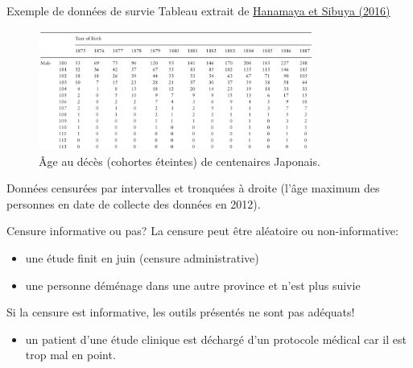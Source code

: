 \documentclass[
  ignorenonframetext,
]{beamer}
\providecommand{\tightlist}{%
  \setlength{\itemsep}{0pt}\setlength{\parskip}{0pt}}\usepackage{longtable,booktabs,array}
\begin{document}
\begin{frame}{Exemple de données de survie}
\protect\hypertarget{exemple-de-donnuxe9es-de-survie}{}
Tableau extrait de \href{https://doi.org/10.1093/gerona/glv113}{Hanamaya
et Sibuya (2016)}

\begin{figure}

{\centering \includegraphics[width=0.8\textwidth,height=\textheight]{figures/Sibuya_tabular.png}

}

\caption{Âge au décès (cohortes éteintes) de centenaires Japonais.}

\end{figure}

\small

Données censurées par intervalles et tronquées à droite (l'âge maximum
des personnes en date de collecte des données en 2012).

\normalsize
\end{frame}

\begin{frame}{Censure informative ou pas?}
\protect\hypertarget{censure-informative-ou-pas}{}
La censure peut être aléatoire ou non-informative:

\begin{itemize}
\tightlist
\item
  une étude finit en juin (censure administrative)
\item
  une personne déménage dans une autre province et n'est plus suivie
\end{itemize}

Si la censure est informative, les outils présentés ne sont pas
adéquats!

\begin{itemize}
\tightlist
\item
  un patient d'une étude clinique est déchargé d'un protocole médical
  car il est trop mal en point.
\end{itemize}
\end{frame}
\end{document}
